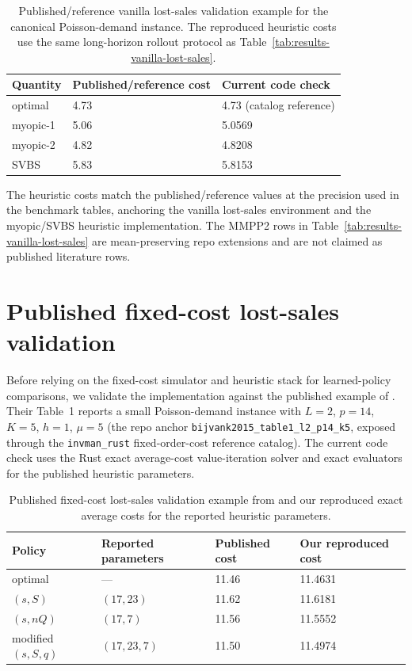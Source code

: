 \documentclass[11pt]{article}
\begin{document}
\begin{table}[!htbp]
\centering
\caption{Published/reference vanilla lost-sales validation example for the canonical
Poisson-demand instance. The reproduced heuristic costs use the same long-horizon rollout protocol as
Table~\ref{tab:results-vanilla-lost-sales}.}
\label{tab:vanilla-lost-sales-validation}
\begin{tabular}{lll}
\toprule
Quantity & Published/reference cost & Current code check \\
\midrule
optimal & 4.73 & 4.73 (catalog reference) \\
myopic-1 & 5.06 & 5.0569 \\
myopic-2 & 4.82 & 4.8208 \\
SVBS & 5.83 & 5.8153 \\
\bottomrule
\end{tabular}
\end{table}
\FloatBarrier

The heuristic costs match the published/reference values at the precision used in the benchmark
tables, anchoring the vanilla lost-sales environment and the myopic/SVBS heuristic implementation.
The MMPP2 rows in Table~\ref{tab:results-vanilla-lost-sales} are mean-preserving repo extensions and
are not claimed as published literature rows.

\section{Published fixed-cost lost-sales validation}

Before relying on the fixed-cost simulator and heuristic stack for learned-policy comparisons, we
validate the implementation against the published example of
\citet{Bijvank2015ParametricPolicies}. Their Table~1 reports a small Poisson-demand instance with
$L=2$, $p=14$, $K=5$, $h=1$, $\mu=5$ (the repo anchor
\texttt{bijvank2015\_table1\_l2\_p14\_k5}, exposed through the
\texttt{invman\_rust} fixed-order-cost reference catalog). The current code check uses the Rust
exact average-cost value-iteration solver and exact evaluators for the published heuristic
parameters.

\begin{table}[!htbp]
\centering
\caption{Published fixed-cost lost-sales validation example from
\citet{Bijvank2015ParametricPolicies} and our reproduced exact average costs for the reported
heuristic parameters.}
\label{tab:fixed-cost-validation}
\begin{tabular}{llll}
\toprule
Policy & Reported parameters & Published cost & Our reproduced cost \\
\midrule
optimal & --- & 11.46 & 11.4631 \\
$(s,S)$ & $(17,23)$ & 11.62 & 11.6181 \\
$(s,nQ)$ & $(17,7)$ & 11.56 & 11.5552 \\
modified $(s,S,q)$ & $(17,23,7)$ & 11.50 & 11.4974 \\
\bottomrule
\end{tabular}
\end{table}
\FloatBarrier
\end{document}
